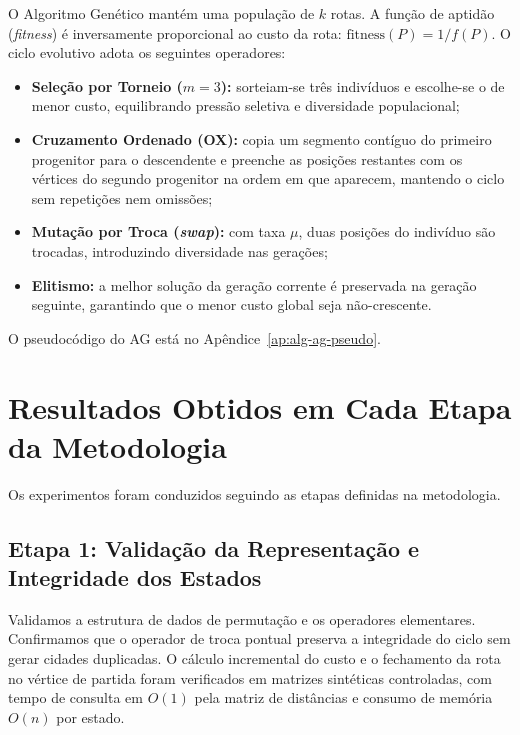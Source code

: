 \documentclass[11pt]{article}
\begin{document}
O Algoritmo Genético mantém uma população de $k$ rotas. A função de aptidão (\textit{fitness}) é inversamente proporcional ao custo da rota: $\text{fitness}(P) = 1 / f(P)$. O ciclo evolutivo adota os seguintes operadores:
\begin{itemize}\setlength{\itemsep}{0pt}\setlength{\parskip}{2pt}
    \item \textbf{Seleção por Torneio ($m=3$):} sorteiam-se três indivíduos e escolhe-se o de menor custo, equilibrando pressão seletiva e diversidade populacional;
    \item \textbf{Cruzamento Ordenado (OX):} copia um segmento contíguo do primeiro progenitor para o descendente e preenche as posições restantes com os vértices do segundo progenitor na ordem em que aparecem, mantendo o ciclo sem repetições nem omissões;
    \item \textbf{Mutação por Troca (\textit{swap}):} com taxa $\mu$, duas posições do indivíduo são trocadas, introduzindo diversidade nas gerações;
    \item \textbf{Elitismo:} a melhor solução da geração corrente é preservada na geração seguinte, garantindo que o menor custo global seja não-crescente.
\end{itemize}
O pseudocódigo do AG está no Apêndice~\ref{ap:alg-ag-pseudo}.

\section{Resultados Obtidos em Cada Etapa da Metodologia}

Os experimentos foram conduzidos seguindo as etapas definidas na metodologia.

\subsection{Etapa 1: Validação da Representação e Integridade dos Estados}
Validamos a estrutura de dados de permutação e os operadores elementares. Confirmamos que o operador de troca pontual preserva a integridade do ciclo sem gerar cidades duplicadas. O cálculo incremental do custo e o fechamento da rota no vértice de partida foram verificados em matrizes sintéticas controladas, com tempo de consulta em $O(1)$ pela matriz de distâncias e consumo de memória $O(n)$ por estado.
\end{document}
